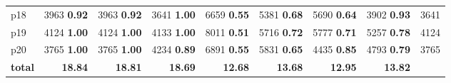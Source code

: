 \begin{tabular}{|l|rrrrrrr|r|}
p18 & {\footnotesize 3963} \textbf{0.92} & {\footnotesize 3963} \textbf{0.92} & {\footnotesize 3641} \textbf{1.00} & {\footnotesize 6659} \textbf{0.55} & {\footnotesize 5381} \textbf{0.68} & {\footnotesize 5690} \textbf{0.64} & {\footnotesize 3902} \textbf{0.93} & 3641\\
p19 & {\footnotesize 4124} \textbf{1.00} & {\footnotesize 4124} \textbf{1.00} & {\footnotesize 4133} \textbf{1.00} & {\footnotesize 8011} \textbf{0.51} & {\footnotesize 5716} \textbf{0.72} & {\footnotesize 5777} \textbf{0.71} & {\footnotesize 5257} \textbf{0.78} & 4124\\
p20 & {\footnotesize 3765} \textbf{1.00} & {\footnotesize 3765} \textbf{1.00} & {\footnotesize 4234} \textbf{0.89} & {\footnotesize 6891} \textbf{0.55} & {\footnotesize 5831} \textbf{0.65} & {\footnotesize 4435} \textbf{0.85} & {\footnotesize 4793} \textbf{0.79} & 3765\\
\hline
\textbf{total} & \textbf{18.84} & \textbf{18.81} & \textbf{18.69} & \textbf{12.68} & \textbf{13.68} & \textbf{12.95} & \textbf{13.82} & \\
\hline
\end{tabular}

